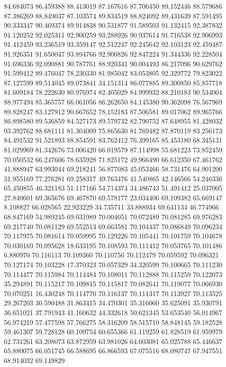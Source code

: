 84.684073
86.459388
88.413019
87.167616
87.706450
89.152446
88.579686
87.386269
88.849037
87.103574
89.834519
88.824092
89.431639
87.591495
90.333347
90.469374
89.914838
90.531877
91.589503
91.132415
92.387832
91.120252
92.025311
92.900259
93.288926
90.937614
91.716538
92.906993
91.412459
93.236519
93.359147
92.512247
92.245642
92.103123
92.459487
91.926351
91.650047
93.894766
92.900826
92.847224
91.344336
92.228504
91.696336
92.090881
90.787761
88.920341
90.004493
86.217096
90.629762
91.599412
89.476047
78.230330
81.985042
83.053805
92.329772
79.823022
87.127599
89.514045
89.073841
34.151314
86.077885
89.300850
85.857718
81.609184
78.222630
80.976974
82.405029
84.999932
88.210183
90.534004
88.977494
85.365757
66.061056
86.262650
84.145380
90.362098
76.567969
89.828247
83.127912
90.667652
78.152183
87.506581
89.017062
89.965766
86.898580
89.536859
84.527173
89.579732
82.790752
87.648955
81.428032
93.392762
88.681111
81.304009
75.865630
81.769482
87.870119
83.256173
84.491532
91.521893
88.854591
83.762412
76.399165
85.453180
68.345131
81.029969
81.342676
73.006420
66.019579
87.114998
55.681223
73.852459
70.050532
66.247606
78.635928
71.825172
49.966490
66.612350
67.461762
41.888947
63.993044
69.218241
56.877083
45.053466
58.731476
64.901200
31.955169
77.276281
69.258317
49.763476
41.540865
42.146566
54.246336
65.450855
46.321183
51.117166
54.714374
34.486743
51.491412
25.037005
27.840601
69.365676
69.467870
69.578177
23.034406
69.109382
65.669147
8.108827
66.028565
22.923229
34.735711
33.888934
69.641134
46.774966
68.847169
54.989245
69.031989
70.004051
70.072489
70.081285
69.976283
69.217740
70.081129
69.552513
69.663581
70.104437
70.086849
70.096234
70.117975
70.081614
70.059995
70.129226
70.105441
70.101759
70.104678
70.030169
70.095628
18.633195
70.108593
70.111412
70.053765
70.101486
6.880970
70.116113
70.109360
70.110756
70.112479
70.059592
70.096321
70.127174
70.103228
17.370323
70.057329
34.320599
70.100665
70.111230
70.114477
70.115984
70.114484
70.108011
70.112888
70.115259
70.122073
35.294891
70.115217
70.109815
70.115817
70.082641
70.119077
70.066930
70.070251
16.430248
70.114770
70.116137
70.111317
70.113927
70.113525
29.267203
30.590488
31.863415
34.470301
35.316060
35.625091
35.930791
36.651021
37.791943
41.160632
44.332618
50.621345
53.653540
56.014967
56.974219
57.477598
57.766275
58.316209
58.515710
58.848145
59.182528
59.461307
59.728128
60.109754
60.655366
61.119259
61.828519
61.959979
62.731261
63.208073
63.872959
63.981026
64.603081
65.025788
65.446637
65.880075
66.051745
66.588695
66.866593
67.075516
68.080747
67.947551
68.914032
69.149829
